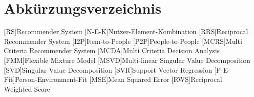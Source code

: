 \renewcommand{\chaptermark}[1]{\markboth{\spacedlowsmallcaps{#1}}{\spacedlowsmallcaps{#1}}}
\renewcommand{\sectionmark}[1]{\markright{\thesection\enspace\spacedlowsmallcaps{#1}}}
\chapter*{Abk\"{u}rzungsverzeichnis}

\begin{acronym}[AWGN]%
  [RS]{Recommender System}
  [N-E-K]{Nutzer-Element-Kombination}
  [RRS]{Reciprocal Recommender System}
  [I2P]{Item-to-People}
  [P2P]{People-to-People}
  [MCRS]{Multi Criteria Recommender System}
  [MCDA]{Multi Criteria Decision Analysis}
  [FMM]{Flexible Mixture Model}
  [MSVD]{Multi-linear Singular Value Decomposition}
  [SVD]{Singular Value Decomposition}
  [SVR]{Support Vector Regression}
  [P-E-Fit]{Person-Environment-Fit}
  [MSE]{Mean Squared Error}
  [RWS]{Reciprocal Weighted Score}
\end{acronym}

\cleardoublepage
